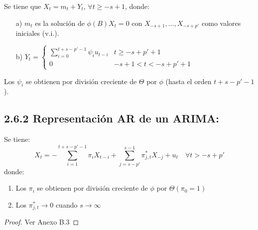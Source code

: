 \begin{teorema}
 Se tiene que $X_{t}= m_{t}+Y_{t}$, $\forall t\geq -s+1$, donde: 
\begin{enumerate}
\item[a)] $m_{t}$ es la soluci\'{o}n de $\phi (B)X_{t} =0$ con $X_{-s+1}, \ldots, X_{-s+p'}$ como valores iniciales (v.i.).
\item[b)] $Y_{t} =\begin{cases}\displaystyle
               \sum_{i=0}^{t+s-p'-1} \psi_{i} u_{t-i} & t\ge -s+p'+1 \\ 
               0 & -s+1<t<-s+p'+1
              \end{cases}$
\end{enumerate}
Los $\psi_{i} $ se obtienen por divisi\'{o}n creciente de $\Theta$ por $\phi $ (hasta el orden $t+s-p'-1$).
\end{teorema}

\subsection{2.6.2 Representaci\'{o}n AR de un ARIMA:}

\begin{teorema}
 Se tiene:
\[
X_{t} =-\sum_{i=1}^{t+s-p'-1} {\pi_{i} X_{t-i} +} \sum_{j=s-p'}^{s-1} {\pi_{j,t}^{\ast } X_{-j} +u_{t} } 
\quad \forall t>-s+p'
\]
donde:
\begin{enumerate}
\item Los $\pi_{i} $ se obtienen por divisi\'{o}n creciente de $\phi $ por $\Theta (\pi_{0} =1)$
\item Los $\pi_{j,t}^{\ast } \to 0$ cuando $s\to \infty$
\end{enumerate}
\end{teorema}

\begin{proof}
 Ver Anexo B.3
\end{proof}

